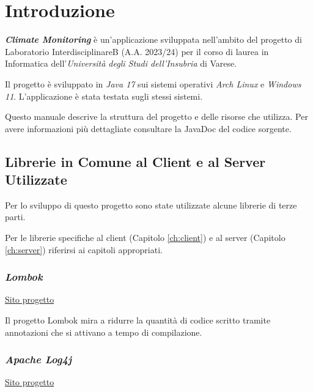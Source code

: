 \maketitle

\cleardoublepage
{}
{}
\tableofcontents

\listoffigures

\chapter{Introduzione}
\textsl{\textbf{Climate Monitoring}} è un'applicazione sviluppata nell’ambito del progetto di Laboratorio InterdisciplinareB (A.A. 2023/24) per il corso di laurea in Informatica dell’\textsl{Universit\`a degli Studi dell’Insubria} di Varese.

Il progetto è sviluppato in \textsl{Java 17} sui sistemi operativi \textsl{Arch Linux} e \textsl{Windows 11}.
L'applicazione è stata testata sugli stessi sistemi.

Questo manuale descrive la struttura del progetto e delle risorse che utilizza. Per avere informazioni più dettagliate consultare la JavaDoc del codice sorgente.

\section{Librerie in Comune al Client e al Server Utilizzate}

Per lo sviluppo di questo progetto sono state utilizzate alcune librerie di terze parti.

Per le librerie specifiche al client (Capitolo \ref{ch:client}) e al server (Capitolo \ref{ch:server}) riferirsi ai capitoli appropriati.

\subsection{\textsl{Lombok}}

\href{https://projectlombok.org/}{Sito progetto}

Il progetto Lombok mira a ridurre la quantità di codice scritto tramite annotazioni che si attivano a tempo di compilazione.

\subsection{\textsl{Apache Log4j}}

\href{https://logging.apache.org/log4j/2.x/}{Sito progetto}

